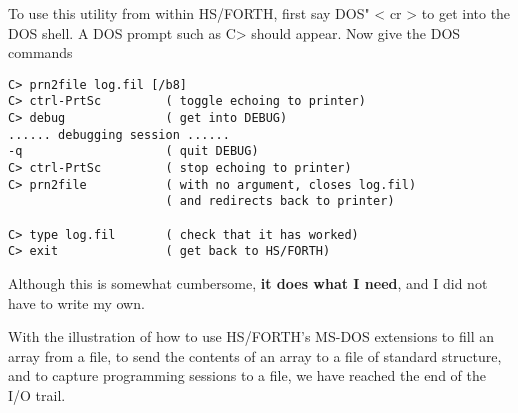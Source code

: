 To use this utility from within HS/FORTH, first say DOS" < cr > to get into the DOS shell. A DOS prompt such as C> should appear.
Now give the DOS commands

\begin{lstlisting}
C> prn2file log.fil [/b8]
C> ctrl-PrtSc         ( toggle echoing to printer)
C> debug              ( get into DEBUG)
...... debugging session ......
-q                    ( quit DEBUG)
C> ctrl-PrtSc         ( stop echoing to printer)
C> prn2file           ( with no argument, closes log.fil)
                      ( and redirects back to printer)

C> type log.fil       ( check that it has worked)
C> exit               ( get back to HS/FORTH)
\end{lstlisting}

Although this is somewhat cumbersome, \textbf{it does what I need}, and I did not have to write my own.

With the illustration of how to use HS/FORTH's MS-DOS extensions to fill an array from a file, to send the contents of an array to a file of standard structure, and to capture programming sessions to a file, we have reached the end of the I/O trail.